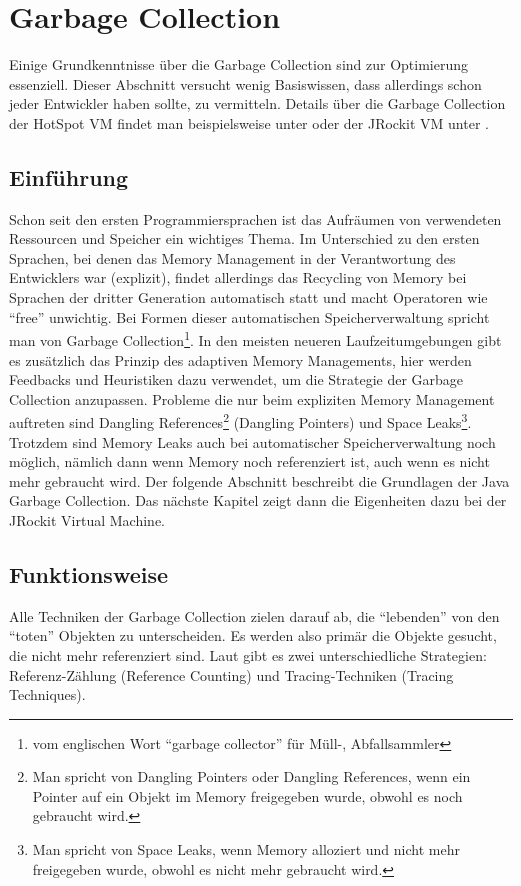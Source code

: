 \chapter{Garbage Collection}\label{grundlagen_gc}
Einige Grundkenntnisse über die Garbage Collection sind zur Optimierung essenziell. Dieser Abschnitt versucht wenig Basiswissen, dass allerdings schon jeder Entwickler haben sollte, zu vermitteln. Details über die Garbage Collection der HotSpot VM findet man beispielsweise unter \cite{langerkreftJavaCore} oder der JRockit VM unter \cite{lagergren2010oracle}.

\section{Einführung}
Schon seit den ersten Programmiersprachen ist das Aufräumen von verwendeten Ressourcen und Speicher ein wichtiges Thema. Im Unterschied zu den ersten Sprachen, bei denen das Memory Management in der Verantwortung des Entwicklers war (explizit), findet allerdings das Recycling von Memory bei Sprachen der dritter Generation automatisch statt und macht Operatoren wie ``free'' unwichtig. Bei Formen dieser automatischen Speicherverwaltung spricht man von Garbage Collection\footnote{vom englischen Wort ``garbage collector'' für Müll-, Abfallsammler}. In den meisten neueren Laufzeitumgebungen gibt es zusätzlich das Prinzip  des adaptiven Memory Managements, hier werden Feedbacks und Heuristiken dazu verwendet, um die Strategie der Garbage Collection anzupassen.
Probleme die nur beim expliziten Memory Management auftreten sind  Dangling References\footnote{Man spricht von Dangling Pointers oder Dangling References, wenn ein Pointer auf ein Objekt im Memory freigegeben wurde, obwohl es noch gebraucht wird.} (Dangling Pointers) und Space Leaks\footnote{Man spricht von Space Leaks, wenn Memory alloziert und nicht mehr freigegeben wurde, obwohl es nicht mehr gebraucht wird.\cite{sunMemoryManagementWP}}. Trotzdem sind Memory Leaks auch bei automatischer Speicherverwaltung noch möglich, nämlich dann wenn Memory noch referenziert ist, auch wenn es nicht mehr gebraucht wird.
Der folgende Abschnitt beschreibt die Grundlagen der Java Garbage Collection. Das nächste Kapitel zeigt dann die Eigenheiten dazu bei der JRockit Virtual Machine.

\section{Funktionsweise}
Alle Techniken der Garbage Collection zielen darauf ab, die ``lebenden'' von den ``toten'' Objekten zu unterscheiden. Es werden also primär die Objekte gesucht, die nicht mehr referenziert sind. Laut \cite[S. 77]{lagergren2010oracle} gibt es zwei unterschiedliche Strategien: Referenz-Zählung (Reference Counting) und Tracing-Techniken (Tracing Techniques).

